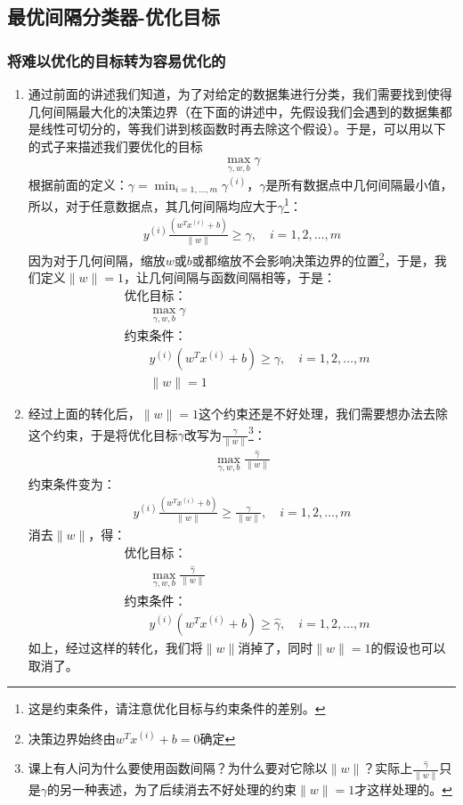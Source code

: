 \subsection{最优间隔分类器-优化目标}
\subsubsection{将难以优化的目标转为容易优化的}
\begin{enumerate}
	\item 通过前面的讲述我们知道，为了对给定的数据集进行分类，我们需要找到使得几何间隔最大化的决策边界（在下面的讲述中，先假设我们会遇到的数据集都是线性可切分的，等我们讲到核函数时再去除这个假设）。于是，可以用以下的式子来描述我们要优化的目标
	\begin{align}
		\max_{\gamma, w, b} \gamma
	\end{align}
	根据前面的定义：$\gamma = \min_{i=1,\dots,m}\gamma^{(i)}$，$\gamma$是所有数据点中几何间隔最小值，所以，对于任意数据点，其几何间隔均应大于$\gamma$\footnote{这是约束条件，请注意优化目标与约束条件的差别。}：
	\begin{align}
		y^{(i)}\frac{(w^Tx^{(i)}+b)}{\|w\|} \geq \gamma, \quad i=1, 2, \dots, m
	\end{align}
	因为对于几何间隔，缩放$w$或$b$或都缩放不会影响决策边界的位置\footnote{决策边界始终由$w^Tx^{(i)}+b=0$确定}，于是，我们定义$\|w\|=1$，让几何间隔与函数间隔相等，于是：
	\begin{align}
		&\text{优化目标：} \\
		& \qquad \max_{\gamma, w, b} \gamma \\
		&\text{约束条件：} \\
		& \qquad y^{(i)}(w^Tx^{(i)}+b) \geq \gamma, \quad i=1, 2, \dots, m \\
		& \qquad \|w\| = 1
	\end{align}

	\item 经过上面的转化后，$\|w\|=1$这个约束还是不好处理，我们需要想办法去除这个约束，于是将优化目标$\gamma$改写为$\frac{\hat{\gamma}}{\|w\|}$\footnote{课上有人问为什么要使用函数间隔？为什么要对它除以$\|w\|$？实际上$\frac{\hat{\gamma}}{\|w\|}$只是$\gamma$的另一种表述，为了后续消去不好处理的约束$\|w\| = 1$才这样处理的。}：
	\begin{align}
		\max_{\gamma, w, b} \frac{\hat{\gamma}}{\|w\|}
	\end{align}
	约束条件变为：
	\begin{align}
		y^{(i)}\frac{(w^Tx^{(i)}+b)}{\|w\|} \geq \frac{\hat{\gamma}}{\|w\|}, \quad i=1, 2, \dots, m
	\end{align}
	消去$\|w\|$，得：
	\begin{align}
		&\text{优化目标：} \\
		& \qquad \max_{\gamma, w, b} \frac{\hat{\gamma}}{\|w\|} \\
		&\text{约束条件：} \\
		& \qquad y^{(i)}(w^Tx^{(i)}+b) \geq \hat{\gamma}, \quad i=1, 2, \dots, m
	\end{align}
	如上，经过这样的转化，我们将$\|w\|$消掉了，同时$\|w\| = 1$的假设也可以取消了。


\end{enumerate}
